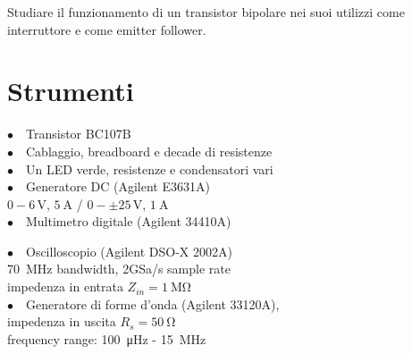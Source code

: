 Studiare il funzionamento di un transistor bipolare nei suoi utilizzi come interruttore %
e come emitter follower.%

\section{Strumenti}
%
\noindent
\begin{minipage}{.5\linewidth}
$\bullet \quad$Transistor BC107B\\
$\bullet \quad$Cablaggio, breadboard e decade di resistenze\\
$\bullet \quad$Un LED verde, resistenze e condensatori vari\\
$\bullet \quad$Generatore DC (Agilent E3631A)\\
\phantom{xxxx}$0-6\,\si{\volt}$, $\SI{5}{\ampere}$ / $0-\pm25\,\si{\volt}$, $\SI{1}{\ampere}$\\
$\bullet \quad$Multimetro digitale (Agilent 34410A)\\
\end{minipage}%
\begin{minipage}{.5\linewidth}
$\bullet \quad$Oscilloscopio (Agilent DSO-X 2002A)\\
\phantom{xxxx}\SI{70}{\mega\hertz} bandwidth, 2GSa/s sample rate\\
\phantom{xxxx}impedenza in entrata $Z_{in}=\SI{1}{\mega\ohm}$\\
$\bullet \quad$Generatore di forme d'onda (Agilent 33120A),\\
\phantom{xxxx}impedenza in uscita $R_s=\SI{50}{\ohm}$\\
\phantom{xxxx}frequency range: \SI{100}{\micro\hertz} - \SI{15}{\mega\hertz}\\
\end{minipage}